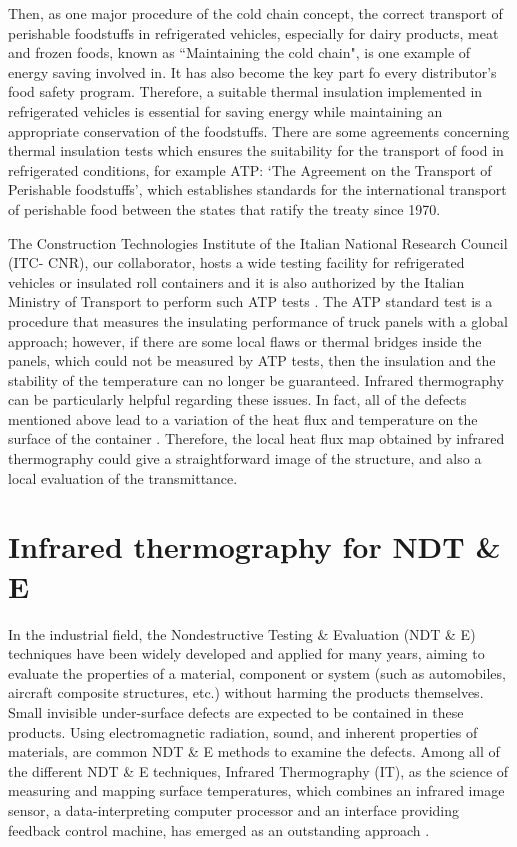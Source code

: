 Then, as one major procedure of the cold chain concept, the correct transport of perishable foodstuffs in refrigerated vehicles, especially for dairy products, meat and frozen foods, known as ``Maintaining the cold chain", is one example of energy saving involved in. It has also become the key part fo every distributor's food safety program. Therefore, a suitable thermal insulation implemented in refrigerated vehicles is essential for saving energy while maintaining an appropriate conservation of the foodstuffs. There are some agreements concerning thermal insulation tests which ensures the suitability for the transport of food in refrigerated conditions, for example ATP: ‘The Agreement on the Transport of Perishable foodstuffs’\citep{Geneva1970}, which establishes standards for the international transport of perishable food between the states that ratify the treaty since 1970.

The Construction Technologies Institute of the Italian National Research Council (ITC- CNR), our collaborator, hosts a wide testing facility for refrigerated vehicles or insulated roll containers and it is also authorized by the Italian Ministry of Transport to perform such ATP tests \citep{Tassou2009,dragano2009experimental}. The ATP standard test is a procedure that measures the insulating performance of truck panels with a global approach; however, if there are some local flaws or thermal bridges inside the panels, which could not be measured by ATP tests, then the insulation and the stability of the temperature can no longer be guaranteed. Infrared thermography can be particularly helpful regarding these issues. In fact, all of the defects mentioned above lead to a variation of the heat flux and temperature on the surface of the container \citep{grinzato2010r, grinzatoquality, grinzato1comparison}. Therefore, the local heat flux map obtained by infrared thermography could give a straightforward image of the structure, and also a local evaluation of the transmittance.

\section{Infrared thermography for NDT \& E}
In the industrial field, the Nondestructive Testing \& Evaluation (NDT \& E) techniques have been  widely developed and applied for many years, aiming to evaluate the properties of a material, component or system (such as automobiles, aircraft composite structures, etc.) without harming the products themselves. Small invisible under-surface defects are expected to be contained in these products. Using electromagnetic radiation, sound, and inherent properties of materials, are common NDT \& E methods to examine the defects. Among all of the different NDT \& E techniques, Infrared Thermography (IT), as the science of measuring and mapping surface temperatures, which combines an infrared image sensor, a data-interpreting computer processor and an interface providing feedback control machine, has emerged as an  outstanding approach \citep{maldague3introduction,cielo1987thermographie,Maldague2001theory,stanley1994non,pradere2009microscale,avdelidis2004applications}.

